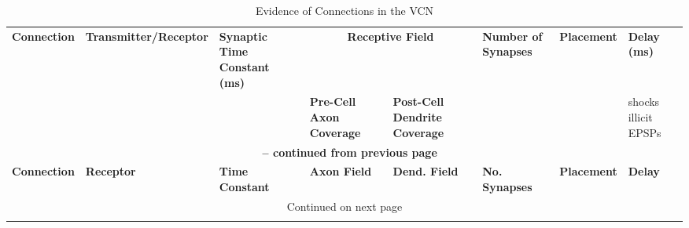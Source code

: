 \begin{longtable}{cXXXXXXX}%
%
\caption{Evidence of Connections in the VCN}\label{tab:Connections} \\
\toprule  {\textbf{Connection}} & {\textbf{Transmitter\slash Receptor}} & {\textbf{Synaptic Time Constant (ms)}} & \multicolumn{2}{c}{\textbf{Receptive Field}} & {\textbf{Number of Synapses}} & {\textbf{Placement}} & {\textbf{Delay (ms)}}\\
&&& {\textbf{Pre-Cell Axon Coverage}} & {\textbf{Post-Cell Dendrite Coverage}} &&& shocks illicit EPSPs \\ \midrule 
\endfirsthead

\multicolumn{8}{c}{{\bfseries \tablename\ \thetable{} -- continued from previous page}} \\
\midrule {\textbf{Connection}} & {\textbf{Receptor}} & {\textbf{Time Constant}} & {\textbf{Axon Field}}& {\textbf{Dend. Field}} & {\textbf{No. Synapses}} & {\textbf{Placement}} & {\textbf{Delay}} \\ \midrule 
\endhead

\midrule \multicolumn{8}{c}{{Continued on next page}} \\ %
\endfoot
\bottomrule
\endlastfoot


\end{longtable}
